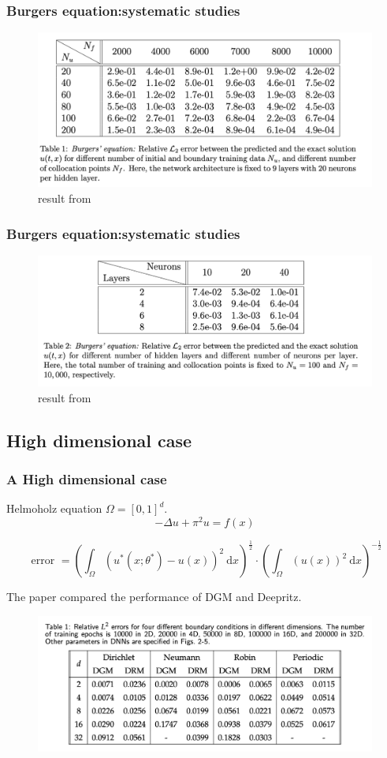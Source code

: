 \documentclass[8pt,aspectratio=15,mathserif]{beamer}
\begin{document}
\begin{frame}
\frametitle{Burgers equation:systematic studies}
\begin{figure}
\centering
\includegraphics[width=0.8\linewidth]{img/Table1.png}
\caption{result from \cite{PINN}}
\end{figure}
\end{frame}

\begin{frame}
\frametitle{Burgers equation:systematic studies}
\begin{figure}
\centering
\includegraphics[width=0.8\linewidth]{img/Table2.png}
\caption{result from \cite{PINN}}
\end{figure}
\end{frame}

\subsection{High dimensional case}
\begin{frame}
\frametitle{A High dimensional case}
\begin{block}{Helmoholz equation}
$\Omega=[0,1]^d$.
$$
-\Delta u+\pi^{2} u=f(x)
$$
\end{block}
\begin{definition}
$$
\text { error }=\left(\int_{\Omega}\left(u^{*}\left(x ; \theta^{*}\right)-u(x)\right)^{2} \mathrm{~d} x\right)^{\frac{1}{2}} \cdot\left(\int_{\Omega}(u(x))^{2} \mathrm{~d} x\right)^{-\frac{1}{2}}
$$
\end{definition}
The paper \cite{Compare} compared the performance of DGM and Deepritz.
\begin{figure}
\centering
\includegraphics[width=0.7\linewidth]{img/high_Poisson.png}
\end{figure}
\end{frame}
\end{document}
